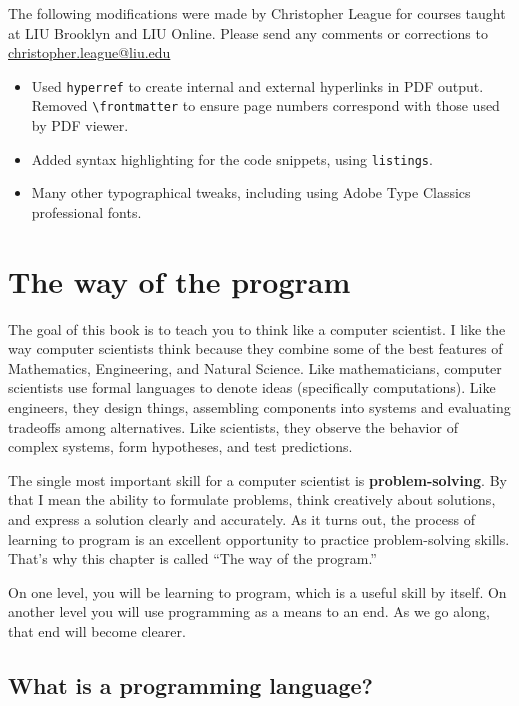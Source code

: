 \documentclass[12pt]{book}
\theoremstyle{definition}
\begin{document}
The following modifications were made by Christopher League for
courses taught at LIU Brooklyn and LIU Online. Please send any
comments or corrections to \url{christopher.league@liu.edu}

\begin{itemize}
\item Used \texttt{hyperref} to create internal and external
  hyperlinks in PDF output. Removed \verb+\frontmatter+ to ensure page
  numbers correspond with those used by PDF viewer.
\item Added syntax highlighting for the code snippets, using
  \verb+listings+.
\item Many other typographical tweaks, including using Adobe Type
  Classics professional fonts.
\end{itemize}




\setcounter{tocdepth}{1}
\tableofcontents


\chapter{The way of the program}
\label{chap01}

The goal of this book is to teach you to think like a
computer scientist.  I like the way computer scientists think because
they combine some of the best features of Mathematics, Engineering,
and Natural Science.  Like mathematicians, computer scientists use formal
languages to denote ideas (specifically computations).  Like
engineers, they design things, assembling components into systems and
evaluating tradeoffs among alternatives.  Like scientists,
they observe the behavior of complex systems, form hypotheses, and test
predictions.

The single most important skill for a computer scientist is {\bf
problem-solving}.  By that I mean the ability to formulate problems,
think creatively about solutions, and express a solution clearly and
accurately.  As it turns out, the process of learning to program is an
excellent opportunity to practice problem-solving skills.  That's why
this chapter is called ``The way of the program.''

On one level, you will be learning to program, which is a useful
skill by itself.  On another level you will use programming
as a means to an end.  As we go along, that end will
become clearer.

\section{What is a programming language?}
\end{document}
